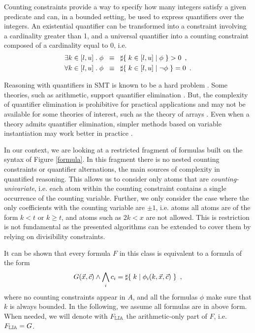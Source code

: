 Counting constraints provide a way to specify how many integers
satisfy a given predicate and can, in a bounded setting, be used to
express quantifiers over the integers. An existential quantifier can
be transformed into a constraint involving a cardinality greater than
1, and a universal quantifier into a counting constraint composed of a
cardinality equal to 0, i.e.
\begin{align*}
  \exists k \in [l, u]\;.\; \phi &\;\;\equiv\;\; \sharp\lbrace\;k \in [l, u] \;|\;\phi\;\rbrace > 0 \enspace,\\
  \forall k \in [l, u]\;.\; \phi &\;\;\equiv\;\; \sharp\lbrace\;k \in [l, u] \;|\;\neg \phi\;\rbrace = 0 \enspace.
\end{align*}

Reasoning with quantifiers in SMT is known to be a hard problem
\cite{ge2010solving,weispfenning1988complexity}. Some theories, such
as arithmetic, support quantifier elimination \cite{cooper}. But, the
complexity of quantifier elimination is prohibitive for practical
applications and may not be available for some theories of interest,
such as the theory of arrays \cite{bradley2006s}. Even when a theory
admits quantifier elimination,  simpler methods based on variable
instantiation may work better in practice \cite{dutertre2015solving}.

In our context, we are looking at a restricted fragment of formulas
built on the syntax of Figure \ref{formula}. In this fragment there is
no nested counting constraints or quantifier alternations, the main
sources of complexity in quantified reasoning. This allows us to
consider only atoms that are \emph{counting-univariate}, i.e. each
atom within the counting constraint contains a single occurrence of
the counting variable. Further, we only consider the case where the
only coefficients with the counting variable are $\pm 1$, i.e. atoms
all atoms are of the form $k < t$ or $k \geq t$, and atoms such as $2k <
x$ are not allowed. This is restriction is not fundamental as the
presented algorithms can be extended to cover them by relying on
divisibility constraints.

It can be shown that every formula $F$ in this class is equivalent to a
formula of the form
\begin{equation}
\label{maingoal}
G(\vec{x}, \vec{c}) \land \bigwedge_i c_i = \sharp\lbrace\;k\;|\;\phi_i(k, \vec{x}, \vec{c})\;\rbrace\enspace,
\end{equation}
where no counting constraints appear in $A$, and all the formulas $\phi$
make sure that $k$ is always bounded. In the following, we assume all
formulas are in above form. When needed, we will denote with $F_{\mathbb{LIA}}$
the arithmetic-only part of $F$, i.e. $F_{\mathbb{LIA}} = G$.

